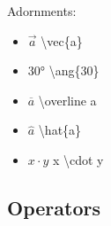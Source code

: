 Adornments: \\
\begin{minipage}{3cm}
\begin{itemize}[label={}]
    \item  $\vec{a}$ \textbackslash vec\{a\}
    \item $\ang{30}$ \textbackslash ang\{30\} 
    \item $\overline{a}$ \textbackslash overline a
\end{itemize} 
\end{minipage}
\begin{minipage}{3cm}
\begin{itemize}[label={}]
    \item $\hat{a}$ \textbackslash hat\{a\} 
    \item $x\cdot y$ x \textbackslash cdot y 
\end{itemize} 
\end{minipage}

\subsection*{Operators} 

